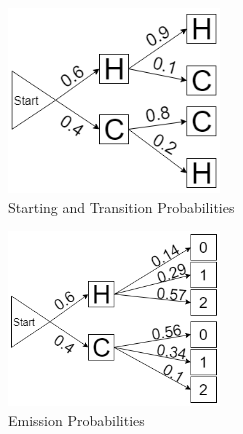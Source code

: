 \documentclass{article}
\begin{document}
\begin{figure}[h]
\caption{Starting and Transition Probabilities}
\centering
\includegraphics[width=0.5\textwidth]{Starting_and_Transition.png}
\end{figure}
\begin{figure}[h]
\caption{Emission Probabilities}
\centering
\includegraphics[width=0.5\textwidth]{Emission.png}
\end{figure}
\end{document}

